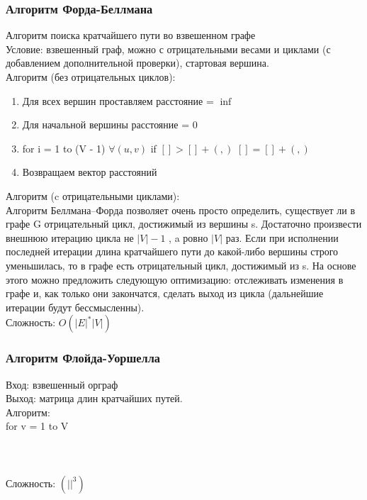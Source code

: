 \documentclass[a4paper]{article}
\begin{document}
\subsubsection{Алгоритм Форда-Беллмана}
Алгоритм поиска кратчайшего пути во взвешенном графе\\
Условие: взвешенный граф, можно с отрицательными весами и циклами (с добавлением дополнительной проверки), стартовая вершина.\\
Алгоритм (без отрицательных циклов):
\begin{enumerate}
	\item Для всех вершин проставляем расстояние = $\inf$
	\item Для начальной вершины расстояние = 0
	\item for i = 1 to (V - 1)
			$\forall (u ,v)$
				if $[] >  [] + (,)$
					$[] = [] + (,)$
	\item Возвращаем вектор расстояний
\end{enumerate}
Алгоритм (c отрицательными циклами):\\
Алгоритм Беллмана–Форда позволяет очень просто определить, существует ли в графе G отрицательный цикл, достижимый из вершины s. Достаточно произвести внешнюю итерацию цикла не $|V|-1$ , a ровно $|V|$ раз. Если при исполнении последней итерации длина кратчайшего пути до какой-либо вершины строго уменьшилась, то в графе есть отрицательный цикл, достижимый из s. На основе этого можно предложить следующую оптимизацию: отслеживать изменения в графе и, как только они закончатся, сделать выход из цикла (дальнейшие итерации будут бессмысленны).\\
Сложность: $O(|E|^*|V|)$

\subsubsection{Алгоритм Флойда-Уоршелла}
Вход: взвешенный орграф\\
Выход: матрица длин кратчайших путей.\\
Алгоритм:\\
for v = 1 to V\\
	\\
			\\
				 \\
Сложность: $(||^3)$
\end{document}
